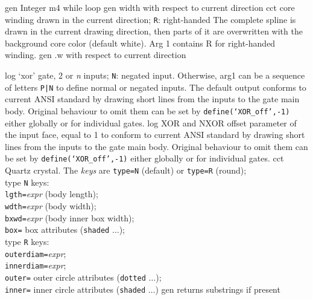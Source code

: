 %

%
  {gen}%
  {Integer m4 while loop}%
%
  {gen}%
  {width with respect to current direction}%
%
  {cct}%
  {core winding drawn in the current direction; {\tt R}: right-handed
   The complete spline is drawn in the current drawing direction, then
   parts of it are overwritten with the background core color (default white).
   Arg 1 contains R for right-handed winding.
   }%
%
  {gen}%
  {.w with respect to current direction}%

%

%
  {log}%
  {`xor' gate, 2 or {\sl n\/} inputs; {\tt N}: negated input.
   Otherwise, arg1 can be a sequence of letters {\tt P|N} to define
   normal or negated inputs.
   The default output conforms to current ANSI standard by drawing short
   lines from the inputs to the gate main body. Original behaviour to
   omit them can be set by {\tt define(`XOR\_off',-1)} either globally
   or for individual gates.
    }%
%
  {log}%
  {XOR and NXOR offset parameter of the input face, equal to 1 to conform
   to current ANSI standard by drawing short lines from the inputs to
   the gate main body.  Original behaviour to omit them can be set by
   {\tt define(`XOR\_off',-1)} either globally or for individual gates.}
%
  {cct}%
  {Quartz crystal. The {\sl keys} are
     {\tt type=N} (default) or {\tt type=R} (round);\\
            type {\tt N} keys:\\
              {\tt lgth=}{\sl expr} (body length);\\
              {\tt wdth=}{\sl expr} (body width);\\
              {\tt bxwd=}{\sl expr} (body inner box width);\\
              {\tt box=} box attributes ({\tt shaded} $\ldots$);\\
            type {\tt R} keys:\\
              {\tt outerdiam=}{\sl expr};\\
              {\tt innerdiam=}{\sl expr};\\
              {\tt outer=} outer circle attributes ({\tt dotted} $\ldots$);\\
              {\tt inner=} inner circle attributes ({\tt shaded} $\ldots$)%
}%
%
  {gen}%
  {returns substrings if present}%

